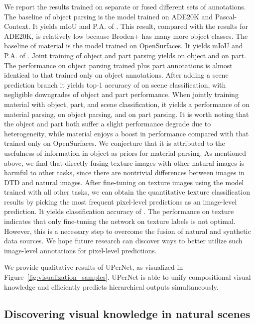 \documentclass[runningheads]{llncs}
\begin{document}
 We report the results trained on separate or fused different sets of annotations. The baseline of object parsing is the model trained on ADE20K and Pascal-Context. It yields mIoU and P.A. of . This result, compared with the results for ADE20K, is relatively low because Broden+ has many more object classes. The baseline of material is the model trained on OpenSurfaces. It yields mIoU and P.A. of . Joint training of object and part parsing yields  on object and  on part. The performance on object parsing trained plus part annotations is almost identical to that trained only on object annotations. After adding a scene prediction branch it yields top-1 accuracy of  on scene classification, with negligible downgrades of object and part performance. When jointly training material with object, part, and scene classification, it yields a performance of  on material parsing,  on object parsing, and  on part parsing. It is worth noting that the object and part both suffer a slight performance degrade due to heterogeneity, while material enjoys a boost in performance compared with that trained only on OpenSurfaces. We conjecture that it is attributed to the usefulness of information in object as priors for material parsing. As mentioned above, we find that directly fusing texture images with other natural images is harmful to other tasks, since there are nontrivial differences between images in DTD and natural images. After fine-tuning on texture images using the model trained with all other tasks, we can obtain the quantitative texture classification results by picking the most frequent pixel-level predictions as an image-level prediction. It yields classification accuracy of . The performance on texture indicates that only fine-tuning the network on texture labels is not optimal. However, this is a necessary step to overcome the fusion of natural and synthetic data sources. We hope future research can discover ways to better utilize such image-level annotations for pixel-level predictions.

 We provide qualitative results of UPerNet, as visualized in Figure~\ref{fig:visualization_samples}. UPerNet is able to unify compositional visual knowledge and efficiently predicts hierarchical outputs simultaneously.

\subsection{Discovering visual knowledge in natural scenes}
\label{sec:visual_knowledge}
\end{document}
